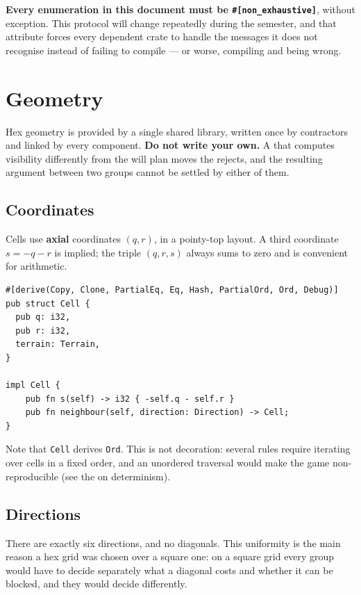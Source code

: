 \documentclass{article}
\begin{document}
\textbf{Every enumeration in this document must be \texttt{\#[non\_exhaustive]}}, without
exception. This protocol will change repeatedly during
the semester, and that attribute forces every dependent crate to handle the messages it does not
recognise instead of failing to compile --- or worse, compiling and being wrong.

\newpage
\section{Geometry}
\label{proto:geometry}

Hex geometry is provided by a single shared library, written once by contractors and linked by
every component. \textbf{Do not write your own.} A \ship{} that computes visibility differently
from the \chart{} will plan moves the \chart{} rejects, and the resulting argument between two
groups cannot be settled by either of them.

\subsection{Coordinates}
\label{proto:coords}

Cells use \textbf{axial} coordinates $(q, r)$, in a pointy-top layout. A third coordinate
$s = -q - r$ is implied; the triple $(q, r, s)$ always sums to zero and is convenient for
arithmetic.

\begin{lstlisting}
#[derive(Copy, Clone, PartialEq, Eq, Hash, PartialOrd, Ord, Debug)]
pub struct Cell {
  pub q: i32,
  pub r: i32,
  terrain: Terrain,
}

impl Cell {
    pub fn s(self) -> i32 { -self.q - self.r }
    pub fn neighbour(self, direction: Direction) -> Cell;
}
\end{lstlisting}

Note that \texttt{Cell} derives \texttt{Ord}. This is not decoration: several rules require
iterating over cells in a fixed order, and an unordered traversal would make the game
non-reproducible (see the \MD{} on determinism).

\subsection{Directions}
\label{proto:directions}

There are exactly six directions, and no diagonals. This uniformity is the main reason a hex grid
was chosen over a square one: on a square grid every group would have to decide separately what a
diagonal costs and whether it can be blocked, and they would decide differently.
\end{document}

